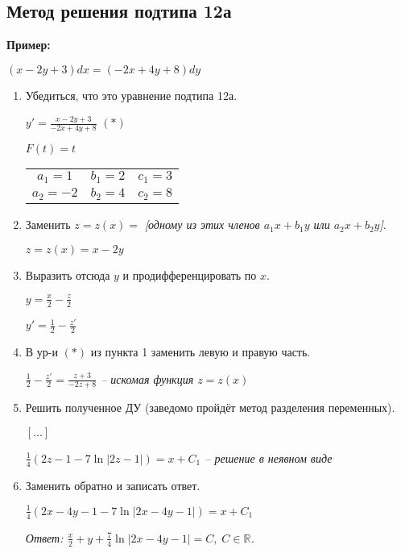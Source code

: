 \documentclass[10pt, a4paper]{article}
\begin{document}
\subsection{Метод решения подтипа 12а}
\textbf{Пример:}
\par $(x - 2y + 3)dx = (-2x  + 4y + 8)dy$
\begin{enumerate}
    \item Убедиться, что это уравнение подтипа 12а.
        \par $y' = \frac{x - 2y + 3}{-2x + 4y + 8}$ $(*)$
        \par $F(t) = t$
        \par \begin{tabular}{c c c}
             $a_1 =  1$  & $b_1 = 2$ & $c_1 = 3$  \\
             $a_2 = -2$ & $b_2 = 4$ & $c_2 = 8$
        \end{tabular}
    \item Заменить $z = z(x) =$ \textit{[одному из этих членов $a_1x + b_1y$ или $a_2x + b_2y$]}.
        \par $z = z(x) = x - 2y$
    \item Выразить отсюда $y$ и продифференцировать по $x$.
        \par $y = \frac{x}{2} - \frac{z}{2}$
        \par $y' = \frac{1}{2} - \frac{z'}{2}$
    \item В ур-и $(*)$ из пункта 1 заменить левую и правую часть.
        \par\textit{$\frac{1}{2} - \frac{z'}{2} = \frac{z + 3}{-2z + 8}$ -- искомая функция $z = z(x)$}
    \item Решить полученное ДУ (заведомо пройдёт метод разделения переменных).
        \par $[...]$
        \par\textit{$\frac{1}{4}(2z - 1 - 7\ln{|2z - 1|}) = x + C_1$ -- решение в неявном виде}
    \item Заменить обратно и записать ответ.
        \par $\frac{1}{4}(2x - 4y - 1 - 7\ln{|2x - 4y - 1|}) = x + C_1$
        \par\textit{Ответ: $\frac{x}{2} + y + \frac{7}{4}\ln{|2x - 4y - 1|} = C,\;C \in \mathbb{R}$.}
\end{enumerate}
\end{document}
